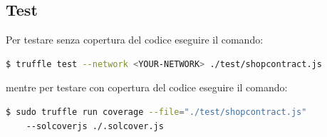 \documentclass[a4paper, 12pt]{article}
\begin{document}
\subsection{Test}
Per testare senza copertura del codice eseguire il comando:
\begin{lstlisting}[language=bash]
  $ truffle test --network <YOUR-NETWORK> ./test/shopcontract.js
\end{lstlisting}
mentre per testare con copertura del codice eseguire il comando:
\begin{lstlisting}[language=bash]
  $ sudo truffle run coverage --file="./test/shopcontract.js"
    --solcoverjs ./.solcover.js
\end{lstlisting}
\end{document}
